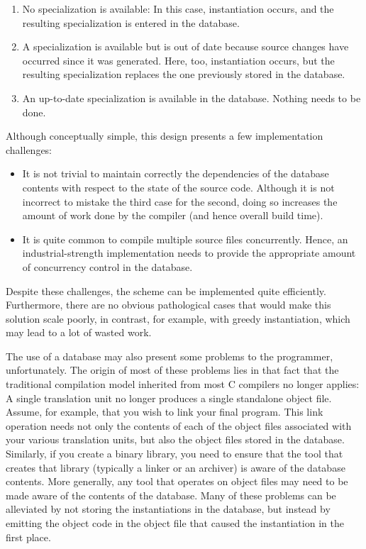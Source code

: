 \begin{enumerate}
\item 
No specialization is available: In this case, instantiation occurs, and the resulting specialization is entered in the database.

\item 
A specialization is available but is out of date because source changes have occurred since it was generated. Here, too, instantiation occurs, but the resulting specialization replaces the one previously stored in the database.

\item 
An up-to-date specialization is available in the database. Nothing needs to be done.
\end{enumerate}

Although conceptually simple, this design presents a few implementation challenges:

\begin{itemize}
\item 
It is not trivial to maintain correctly the dependencies of the database contents with respect to the state of the source code. Although it is not incorrect to mistake the third case for the second, doing so increases the amount of work done by the compiler (and hence overall build time).

\item 
It is quite common to compile multiple source files concurrently. Hence, an industrial-strength implementation needs to provide the appropriate amount of concurrency control in the database.
\end{itemize}

Despite these challenges, the scheme can be implemented quite efficiently. Furthermore, there are no obvious pathological cases that would make this solution scale poorly, in contrast, for example, with greedy instantiation, which may lead to a lot of wasted work.

The use of a database may also present some problems to the programmer, unfortunately. The origin of most of these problems lies in that fact that the traditional compilation model inherited from most C compilers no longer applies: A single translation unit no longer produces a single standalone object file. Assume, for example, that you wish to link your final program. This link operation needs not only the contents of each of the object files associated with your various translation units, but also the object files stored in the database. Similarly, if you create a binary library, you need to ensure that the tool that creates that library (typically a linker or an archiver) is aware of the database contents. More generally, any tool that operates on object files may need to be made aware of the contents of the database. Many of these problems can be alleviated by not storing the instantiations in the database, but instead by emitting the object code in the object file that caused the instantiation in the first place.

